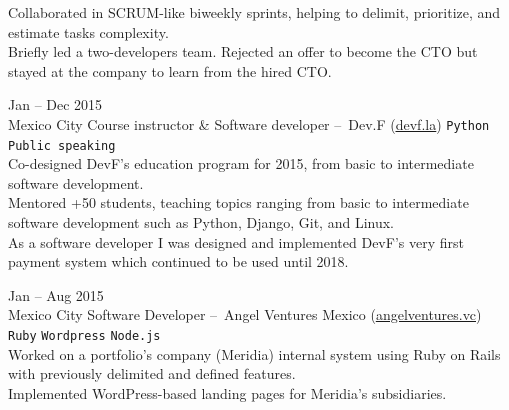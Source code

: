 \documentclass[9pt]{developercv} %
\begin{document}
\begin{entrylist}
{            Collaborated in SCRUM-like biweekly sprints, helping to delimit, prioritize, and estimate 
            tasks complexity.\\
            
            Briefly led a two-developers team. Rejected an offer to become the CTO but stayed at the company to learn from the hired CTO.
        }

    \entry
        {
            Jan -- Dec 2015
            \\\footnotesize{Mexico City}
        }
        {Course instructor \& Software developer – Dev.F ({\href{https://devf.la/}{\underline{devf.la}}})}
        {
            \texttt{Python}
            \slashsep\texttt{Public speaking}
        }
        {\\
            Co-designed DevF's education program for 2015, from basic to intermediate software development. \\

            Mentored +50 students, teaching topics ranging from basic to intermediate software 
            development such as Python, Django, Git, and Linux. \\
            
            As a software developer I was designed and implemented DevF's very first payment system 
            which continued to be used until 2018.
        }

    \entry
        {
            Jan -- Aug 2015
            \\\footnotesize{Mexico City}
        }
        {Software Developer – Angel Ventures Mexico ({\href{http://www.angelventures.vc/}{\underline{angelventures.vc}}})}
        {   
            \texttt{Ruby}
            \slashsep\texttt{Wordpress}
            \slashsep\texttt{Node.js}
        }
        {\\
            Worked on a portfolio's company (Meridia) internal system using Ruby on Rails with 
            previously delimited and defined features. \\

            Implemented WordPress-based landing pages for Meridia's subsidiaries.
        }

\end{entrylist}

\end{document}
